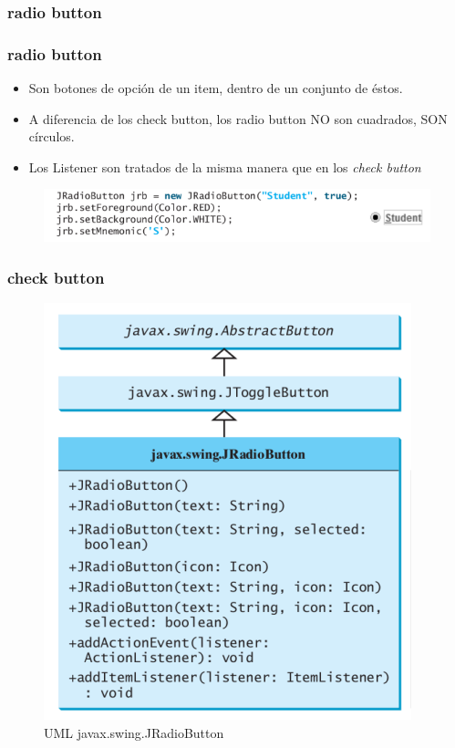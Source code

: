\documentclass{beamer}
\begin{document}
\subsubsection{radio button}
\begin{frame}[fragile]
\frametitle{radio button}
\begin{itemize}[<+->]
\item Son botones de opción de un item, dentro de un conjunto de éstos.
\item A diferencia de los check button, los \alert{radio button} NO son cuadrados, SON círculos.
\item Los \alert{Listener} son tratados de la misma manera que en los \emph{check button} 
\end{itemize}
\pause
\begin{figure}
\includegraphics[scale=0.6]{imagenes/radio1.png}
\end{figure}
\end{frame}

\begin{frame}
\frametitle{check button}
\begin{figure}
\includegraphics[scale=0.6]{imagenes/radio.png}
\caption{UML javax.swing.JRadioButton}
\end{figure}
\end{frame}
\end{document}
